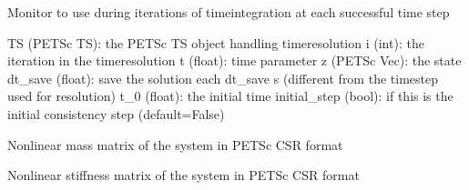 \documentclass[letterpaper,10pt,english]{sphinxmanual}
\begin{document}
\begin{fulllineitems}
\begin{fulllineitems}
\label{\detokenize{scrimp:scrimp.dphs.DPHS.monitor}}
\pysigstartsignatures
\pysiglinewithargsret
{}
{\sphinxparamcomma {}\sphinxparamcomma {}\sphinxparamcomma {}\sphinxparamcomma {}\sphinxparamcomma {}\sphinxparamcomma {}}
{}
\pysigstopsignatures
\sphinxAtStartPar
Monitor to use during iterations of time\sphinxhyphen{}integration at each successful time step
\begin{description}
\sphinxAtStartPar
TS (PETSc TS): the PETSc TS object handling time\sphinxhyphen{}resolution
i (int): the iteration in the time\sphinxhyphen{}resolution
t (float): time parameter
z (PETSc Vec): the state
dt\_save (float): save the solution each dt\_save s (different from the time\sphinxhyphen{}step  used for resolution)
t\_0 (float): the initial time
initial\_step (bool):  if this is the initial consistency step (default=\textasciigrave{}False\textasciigrave{})

\end{description}

\end{fulllineitems}


\begin{fulllineitems}
\label{\detokenize{scrimp:scrimp.dphs.DPHS.nl_mass}}
\pysigstartsignatures
\pysigline
{}
\pysigstopsignatures
\sphinxAtStartPar
Non\sphinxhyphen{}linear mass matrix of the system in PETSc CSR format

\end{fulllineitems}


\begin{fulllineitems}
\label{\detokenize{scrimp:scrimp.dphs.DPHS.nl_stiffness}}
\pysigstartsignatures
\pysigline
{}
\pysigstopsignatures
\sphinxAtStartPar
Non\sphinxhyphen{}linear stiffness matrix of the system in PETSc CSR format


\end{fulllineitems}
\end{fulllineitems}
\end{document}
